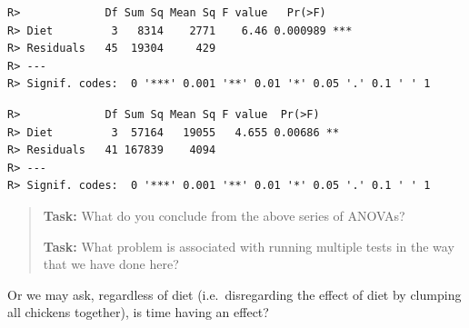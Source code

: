 \documentclass[english,10pt,a4paper,oneside]{book}
\newenvironment{Shaded}{\begin{snugshade}}{\end{snugshade}}
\newcommand{\KeywordTok}[1]{\textcolor[rgb]{0.13,0.29,0.53}{\textbf{#1}}}
\newcommand{\DataTypeTok}[1]{\textcolor[rgb]{0.13,0.29,0.53}{#1}}
\newcommand{\DecValTok}[1]{\textcolor[rgb]{0.00,0.00,0.81}{#1}}
\newcommand{\StringTok}[1]{\textcolor[rgb]{0.31,0.60,0.02}{#1}}
\newcommand{\OperatorTok}[1]{\textcolor[rgb]{0.81,0.36,0.00}{\textbf{#1}}}
\newcommand{\NormalTok}[1]{#1}
\theoremstyle{definition}
\theoremstyle{definition}
\theoremstyle{definition}
\theoremstyle{remark}
\begin{document}
\begin{Shaded}
\end{Shaded}

\begin{verbatim}
R>             Df Sum Sq Mean Sq F value   Pr(>F)    
R> Diet         3   8314    2771    6.46 0.000989 ***
R> Residuals   45  19304     429                     
R> ---
R> Signif. codes:  0 '***' 0.001 '**' 0.01 '*' 0.05 '.' 0.1 ' ' 1
\end{verbatim}

\begin{Shaded}
\end{Shaded}

\begin{verbatim}
R>             Df Sum Sq Mean Sq F value  Pr(>F)   
R> Diet         3  57164   19055   4.655 0.00686 **
R> Residuals   41 167839    4094                   
R> ---
R> Signif. codes:  0 '***' 0.001 '**' 0.01 '*' 0.05 '.' 0.1 ' ' 1
\end{verbatim}

\begin{quote}
\textbf{Task:} What do you conclude from the above series of ANOVAs?

\textbf{Task:} What problem is associated with running multiple tests in
the way that we have done here?
\end{quote}

Or we may ask, regardless of diet (i.e.~disregarding the effect of diet
by clumping all chickens together), is time having an effect?

\begin{Shaded}
\end{Shaded}
\end{document}
